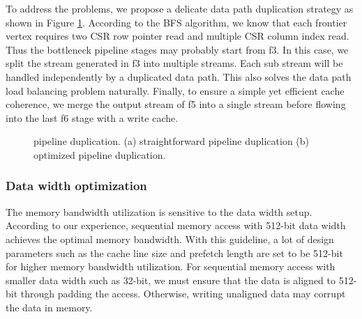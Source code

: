 To address the problems, we propose a delicate data path duplication strategy 
as shown in Figure \ref{fig:duplicate-pipeline}. According to the BFS algorithm, 
we know that each frontier vertex requires two CSR row pointer read and multiple 
CSR column index read. Thus the bottleneck pipeline stages may probably start 
from f3. In this case, we split the stream generated in f3 into 
multiple streams. Each sub stream will be handled independently by a 
duplicated data path. This also solves the data path load balancing problem 
naturally. Finally, to ensure a simple yet efficient cache coherence, we 
merge the output stream of f5 into a single stream before flowing into the 
last f6 stage with a write cache. 

\begin{figure}
    \caption{pipeline duplication. (a) straightforward pipeline duplication 
    (b) optimized pipeline duplication.}
\label{fig:duplicate-pipeline}
\end{figure}


\subsubsection{Data width optimization}
The memory bandwidth utilization is sensitive to the data width setup. 
According to our experience, sequential memory access 
with 512-bit data width achieves the optimal memory bandwidth. With this guideline, 
a lot of design parameters such as the cache line size and prefetch length are 
set to be 512-bit for higher memory bandwidth utilization. For sequential 
memory access with smaller data width such as 32-bit, we must ensure that the 
data is aligned to 512-bit through padding the access. Otherwise, writing 
unaligned data may corrupt the data in memory.


